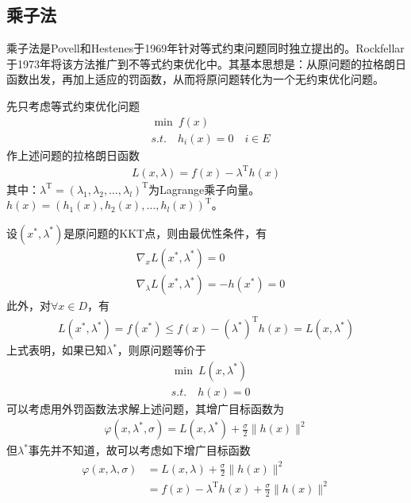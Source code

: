     \subsection{乘子法}
        \par
        乘子法是Povell和Hestenes于1969年针对等式约束问题同时独立提出的。Rockfellar于1973年将该方法推广到不等式约束优化中。其基本思想是：从原问题的拉格朗日函数出发，再加上适应的罚函数，从而将原问题转化为一个无约束优化问题。
        \par
        先只考虑等式约束优化问题
        \begin{align*}
        &\mathop {\min}\  f(x)\\
        &s.t.\quad h_i(x) = 0\quad i \in E
        \end{align*}
        作上述问题的拉格朗日函数
        \begin{align*}
        L(x,\lambda)=f(x)-{\lambda}^\mathrm{T}  h(x)
        \end{align*}
        其中：${\lambda}^\mathrm{T} =({\lambda}_1,{\lambda}_2,\ldots,{\lambda}_l)^\mathrm{T} $为Lagrange乘子向量。$h(x)=(h_1(x),h_2(x),\ldots,h_l(x))^\mathrm{T} $。
        \par
        设$(x^*,{\lambda}^*)$是原问题的KKT点，则由最优性条件，有
        \begin{align*}
        & {\nabla}_xL(x^*,{\lambda}^*)=0\\
        & {\nabla}_{\lambda}L(x^*,{\lambda}^*)=-h(x^*)=0
        \end{align*}
        此外，对$\forall x \in D$，有
        \begin{align*}
        L(x^*,{\lambda}^*)=f(x^*) \leqslant f(x)-({\lambda}^*)^\mathrm{T} h(x)=L(x,{\lambda}^*)
        \end{align*}
        上式表明，如果已知${\lambda}^*$，则原问题等价于
        \begin{align*}
        &\mathop {\min}\ L(x,{\lambda}^*)\\
        &s.t.\quad h(x) = 0
        \end{align*}
        可以考虑用外罚函数法求解上述问题，其增广目标函数为
        \begin{align*}
        \varphi(x,{\lambda}^*,\sigma)=L(x,{\lambda}^*)+\frac{\sigma}{2}\|h(x)\|^2
        \end{align*}
        但${\lambda}^*$事先并不知道，故可以考虑如下增广目标函数
        \begin{align*}
        \varphi(x,{\lambda},\sigma)&=L(x,{\lambda})+\frac{\sigma}{2}\|h(x)\|^2\\
        &=f(x)-{\lambda}^\mathrm{T} h(x)+\frac{\sigma}{2}\|h(x)\|^2
        \end{align*}
